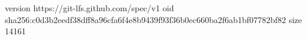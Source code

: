version https://git-lfs.github.com/spec/v1
oid sha256:c0d3b2eedf38dff8a96cfa6f4e8b9439f93f36b0ec660ba2f6ab1bf07782bf82
size 14161

